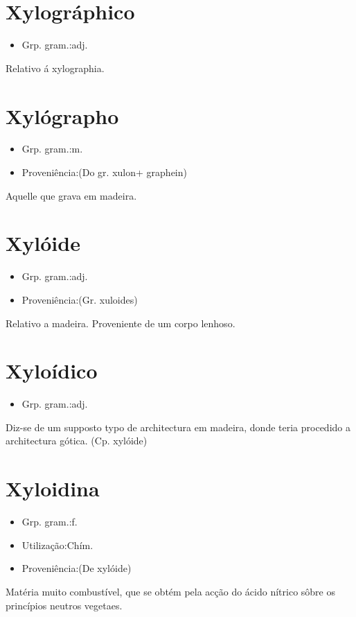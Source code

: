 \section{Xylográphico}
\begin{itemize}
\item {Grp. gram.:adj.}
\end{itemize}
Relativo á xylographia.
\section{Xylógrapho}
\begin{itemize}
\item {Grp. gram.:m.}
\end{itemize}
\begin{itemize}
\item {Proveniência:(Do gr. \textunderscore xulon\textunderscore  + \textunderscore graphein\textunderscore )}
\end{itemize}
Aquelle que grava em madeira.
\section{Xylóide}
\begin{itemize}
\item {Grp. gram.:adj.}
\end{itemize}
\begin{itemize}
\item {Proveniência:(Gr. \textunderscore xuloides\textunderscore )}
\end{itemize}
Relativo a madeira.
Proveniente de um corpo lenhoso.
\section{Xyloídico}
\begin{itemize}
\item {Grp. gram.:adj.}
\end{itemize}
Diz-se de um supposto typo de architectura em madeira, donde teria procedido a architectura gótica.
(Cp. \textunderscore xylóide\textunderscore )
\section{Xyloidina}
\begin{itemize}
\item {Grp. gram.:f.}
\end{itemize}
\begin{itemize}
\item {Utilização:Chím.}
\end{itemize}
\begin{itemize}
\item {Proveniência:(De \textunderscore xylóide\textunderscore )}
\end{itemize}
Matéria muito combustível, que se obtém pela acção do ácido nítrico sôbre os princípios neutros vegetaes.
